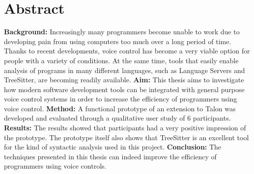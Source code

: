 \documentclass[../thesis.tex]{subfiles}
\begin{document}
\chapter*{Abstract}
\textbf{Background:}
Increasingly many programmers become unable to work
due to developing pain from using computers
too much over a long period of time.
Thanks to recent developments, voice control has become a very viable option
for people with a variety of conditions.
At the same time, tools that easily enable
analysis of programs in many different languages,
such as Language Servers and TreeSitter, are becoming readily available.
\newline
\textbf{Aim:} 
This thesis aims to investigate how modern software development tools
can be integrated with general purpose voice control systems
in order to increase the efficiency of programmers using voice control.
\newline
\textbf{Method:} A functional prototype of an extension to Talon was developed and evaluated through
a qualitative user study of 6 participants.
\newline
\textbf{Results:} The results showed that participants
had a very positive impression of the prototype.
The prototype itself also shows that TreeSitter is an excellent tool
for the kind of syntactic analysis used in this project.
\newline
\textbf{Conclusion:} 
The techniques presented in this thesis
can indeed improve the efficiency of programmers using voice controls.

\end{document}
